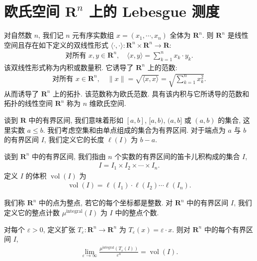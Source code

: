 \documentclass[../../main.tex]{subfiles}
\begin{document}
\section{欧氏空间 $\mathbf{R}^{n}$ 上的 Lebesgue 测度}\label{section:ch20-lebesgue}

对自然数 $n$, 我们记 $n$ 元有序实数组 $x=(x_{1},\cdots,x_{n})$ 全体为 $\mathbf{R}^{n}$. 则 $\mathbf{R}^{n}$ 是线性空间且存在如下定义的双线性形式 $\langle\cdot,\cdot\rangle:\mathbf{R}^{n}\times\mathbf{R}^{n}\to\mathbf{R}$:
\begin{align*}
\text{对所有 }x,y\in\mathbf{R}^{n},\quad\langle x,y\rangle=\sum_{k=1}^{n}x_{k}\cdot y_{k}.
\end{align*}
该双线性形式称为内积或数量积. 它诱导了 $\mathbf{R}^{n}$ 上的范数:
\begin{align*}
\text{对所有 }x\in\mathbf{R}^{n},\quad\|x\|=\sqrt{\langle x,x\rangle}=\sqrt{\sum_{k=1}^{n}x_{k}^{2}}.
\end{align*}
从而诱导了 $\mathbf{R}^{n}$ 上的拓扑. 该范数称为欧氏范数. 具有该内积与它所诱导的范数和拓扑的线性空间 $\mathbf{R}^{n}$ 称为 $n$ 维欧氏空间.

谈到 $\mathbf{R}$ 中的有界区间, 我们意味着形如 $[a,b]$, $[a,b)$, $(a,b]$ 或 $(a,b)$ 的集合, 这里实数 $a\leqslant b$. 我们考虑空集和由单点组成的集合为有界区间. 对于端点为 $a$ 与 $b$ 的有界区间 $I$, 我们定义它的长度 $\ell(I)$ 为 $b-a$.

\begin{definition}\label{definition:ch20-有界区间}
谈到 $\mathbf{R}^{n}$ 中的有界区间, 我们指由 $n$ 个实数的有界区间的笛卡儿积构成的集合 $I$,
\begin{align*}
I=I_{1}\times I_{2}\times\cdots\times I_{n}.
\end{align*}
定义 $I$ 的体积 $\operatorname{vol}(I)$ 为
\begin{align*}
\operatorname{vol}(I)=\ell(I_{1})\cdot\ell(I_{2})\cdots\ell(I_{n}).
\end{align*}
\end{definition}

\begin{definition}[整点计数]\label{definition:ch20-整点计数}
我们称 $\mathbf{R}^{n}$ 中的点为整点, 若它的每个坐标都是整数. 对 $\mathbf{R}^{n}$ 中的有界区间 $I$, 我们定义它的整点计数 $\mu^{\operatorname{integral}}(I)$ 为 $I$ 中的整点个数.
\end{definition}

\begin{lemma}\label{lemma:ch20-整点计数极限}
对每个 $\varepsilon>0$, 定义扩张 $T_{\varepsilon}:\mathbf{R}^{n}\to\mathbf{R}^{n}$ 为 $T_{\varepsilon}(x)=\varepsilon\cdot x$. 则对 $\mathbf{R}^{n}$ 中的每个有界区间 $I$,
\begin{align}\label{align:ch20-整点极限}
\lim_{\varepsilon\to\infty}\frac{\mu^{\operatorname{integral}}(T_{\varepsilon}(I))}{\varepsilon^{n}}=\operatorname{vol}(I).
\end{align}
\end{lemma}
\end{document}
